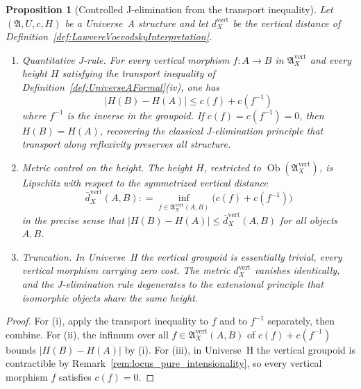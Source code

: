 \documentclass[10pt, reqno]{amsart}
\theoremstyle{plain}
\newtheorem{proposition}[theorem]{Proposition}
\theoremstyle{definition}
\theoremstyle{plain}
\newcommand{\coloneqq}{\mathrel{\mathop:}=}
\begin{document}
\begin{proposition}[Controlled J-elimination from the transport inequality]
\label{prop:ControlledJElimination}
Let $(\mathfrak{A},U,c,H)$ be a Universe~A structure and let $d_X^{\mathrm{vert}}$ be the vertical distance of Definition~\ref{def:LawvereVoevodskyInterpretation}.

\begin{enumerate}
\item[\textup{(i)}] \textit{Quantitative J-rule.} For every vertical morphism $f \colon A \to B$ in $\mathfrak{A}_X^{\mathrm{vert}}$ and every height $H$ satisfying the transport inequality of Definition~\ref{def:UniverseAFormal}(iv), one has
\[
  |H(B) - H(A)| \le c(f) + c(f^{-1})
\]
where $f^{-1}$ is the inverse in the groupoid. If $c(f) = c(f^{-1}) = 0$, then $H(B) = H(A)$, recovering the classical J-elimination principle that transport along reflexivity preserves all structure.

\item[\textup{(ii)}] \textit{Metric control on the height.} The height $H$, restricted to $\operatorname{Ob}(\mathfrak{A}_X^{\mathrm{vert}})$, is Lipschitz with respect to the symmetrized vertical distance
\[
  \bar{d}_X^{\mathrm{vert}}(A,B)
  \coloneqq
  \inf_{f \in \mathfrak{A}_X^{\mathrm{vert}}(A,B)}
  \bigl( c(f) + c(f^{-1}) \bigr)
\]
in the precise sense that $|H(B) - H(A)| \le \bar{d}_X^{\mathrm{vert}}(A,B)$ for all objects $A,B$.

\item[\textup{(iii)}] \textit{Truncation.} In Universe~H the vertical groupoid is essentially trivial, every vertical morphism carrying zero cost. The metric $d_X^{\mathrm{vert}}$ vanishes identically, and the J-elimination rule degenerates to the extensional principle that isomorphic objects share the same height.
\end{enumerate}
\end{proposition}

\begin{proof}
For (i), apply the transport inequality to $f$ and to $f^{-1}$ separately, then combine. For (ii), the infimum over all $f \in \mathfrak{A}_X^{\mathrm{vert}}(A,B)$ of $c(f) + c(f^{-1})$ bounds $|H(B) - H(A)|$ by (i). For (iii), in Universe~H the vertical groupoid is contractible by Remark~\ref{rem:locus_pure_intensionality}, so every vertical morphism $f$ satisfies $c(f) = 0$.
\end{proof}
\end{document}
